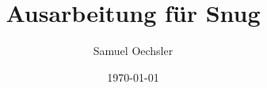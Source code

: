 \documentclass[
    paper    = A4,
    fontsize = 12pt,
    parskip  = full,
]{scrarticle}
\title{Ausarbeitung für Snug}
\author{Samuel Oechsler}
\date{\today}
\begin{document}
    \maketitle
    \setcounter{page}{0}
    \thispagestyle{empty}

    \newpage
    \tableofcontents

    \begin{spacing}{1.2}
        
        
        
        
        
        
    \end{spacing}

    \newpage
    \printbibliography
\end{document}
